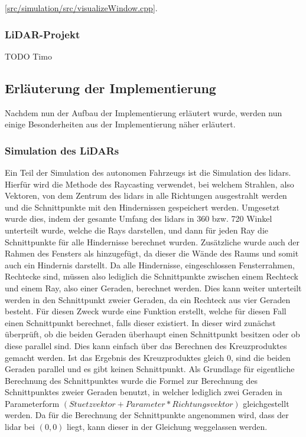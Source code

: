 [\href{https://github.com/Jundy0/Studienarbeit/blob/main/src/simulation/src/visualizeWindow.cpp}{src/simulation/src/visualizeWindow.cpp}]. 

\subsubsection{LiDAR-Projekt}

TODO Timo

\subsection{Erläuterung der Implementierung}

Nachdem nun der Aufbau der Implementierung erläutert wurde, werden nun einige Besonderheiten aus der Implementierung näher erläutert. 

\subsubsection{Simulation des LiDARs}

Ein Teil der Simulation des autonomen Fahrzeugs ist die Simulation des \ac{lidar}s. Hierfür wird die Methode des Raycasting verwendet, bei welchem Strahlen, also Vektoren, von dem Zentrum des \ac{lidar}s in alle Richtungen ausgestrahlt werden und die Schnittpunkte mit den Hindernissen gespeichert werden. Umgesetzt wurde dies, indem der gesamte Umfang des \ac{lidar}s in 360 bzw. 720 Winkel unterteilt wurde, welche die Rays darstellen, und dann für jeden Ray die Schnittpunkte für alle Hindernisse berechnet wurden. Zusätzliche wurde auch der Rahmen des Fensters als hinzugefügt, da dieser die Wände des Raums und somit auch ein Hindernis darstellt. Da alle Hindernisse, eingeschlossen Fensterrahmen, Rechtecke sind, müssen also lediglich die Schnittpunkte zwischen einem Rechteck und einem Ray, also einer Geraden, berechnet werden. Dies kann weiter unterteilt werden in den Schnittpunkt zweier Geraden, da ein Rechteck aus vier Geraden besteht. Für diesen Zweck wurde eine Funktion erstellt, welche für diesen Fall einen Schnittpunkt berechnet, falls dieser existiert. In dieser wird zunächst überprüft, ob die beiden Geraden überhaupt einen Schnittpunkt besitzen oder ob diese parallel sind. Dies kann einfach über das Berechnen des Kreuzproduktes gemacht werden. Ist das Ergebnis des Kreuzproduktes gleich \(0\), sind die beiden Geraden parallel und es gibt keinen Schnittpunkt. Als Grundlage für eigentliche Berechnung des Schnittpunktes wurde die Formel zur Berechnung des Schnittpunktes zweier Geraden benutzt, in welcher lediglich zwei Geraden in Parameterform \((Stuetzvektor + Parameter * Richtungsvektor)\) gleichgestellt werden. Da für die Berechnung der Schnittpunkte angenommen wird, dass der \ac{lidar} bei \((0, 0)\) liegt, kann dieser in der Gleichung weggelassen werden. 

